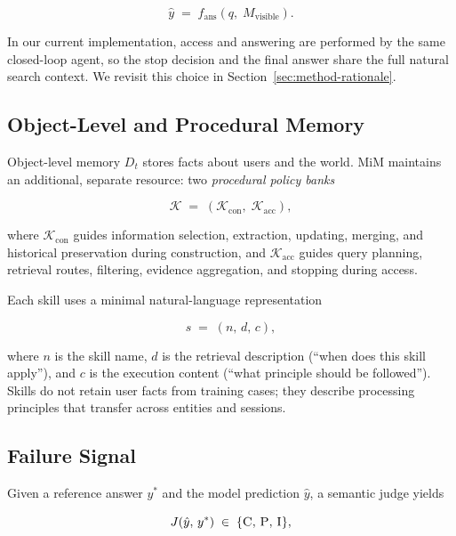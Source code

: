 \documentclass[11pt]{article}
\newcommand{\KK}{\mathcal{K}}
\begin{document}
\begin{equation}
\label{eq:answer}
\hat{y} \;=\; f_{\mathrm{ans}}\left(q,\;M_{\mathrm{visible}}\right).
\end{equation}

In our current implementation, access and answering are performed by the same
closed-loop agent, so the stop decision and the final answer share the full
natural search context. We revisit this choice in
Section~\ref{sec:method-rationale}.

\subsection{Object-Level and Procedural Memory}
\label{sec:prob-object}

Object-level memory $D_t$ stores facts about users and the world. MiM maintains
an additional, separate resource: two \emph{procedural policy banks}

\begin{equation}
\label{eq:banks}
\KK \;=\; \left(\KK_{\mathrm{con}},\;\KK_{\mathrm{acc}}\right),
\end{equation}

\noindent where $\KK_{\mathrm{con}}$ guides information selection, extraction,
updating, merging, and historical preservation during construction, and
$\KK_{\mathrm{acc}}$ guides query planning, retrieval routes, filtering,
evidence aggregation, and stopping during access.

Each skill uses a minimal natural-language representation

\begin{equation}
\label{eq:skill}
s \;=\; (n,\,d,\,c),
\end{equation}

\noindent where $n$ is the skill name, $d$ is the retrieval description
(``when does this skill apply''), and $c$ is the execution content (``what
principle should be followed''). Skills do not retain user facts from training
cases; they describe processing principles that transfer across entities and
sessions.

\subsection{Failure Signal}
\label{sec:prob-failure}

Given a reference answer $y^{*}$ and the model prediction $\hat{y}$, a semantic
judge yields

\begin{equation}
\label{eq:judge}
J(\hat{y},\,y^{*}) \;\in\; \{\textsc{C},\,\textsc{P},\,\textsc{I}\},
\end{equation}
\end{document}
